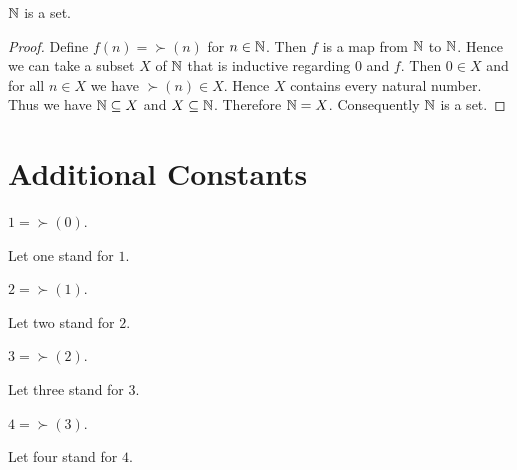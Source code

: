 \documentclass[10pt]{article}
\begin{document}
  \begin{forthel}
    \begin{proposition}
      $\mathbb{N}$ is a set.
    \end{proposition}
    \begin{proof}
      Define $f(n) = \succ(n)$ for $n \in \mathbb{N}$.
      Then $f$ is a map from $\mathbb{N}$ to $\mathbb{N}$.
      Hence we can take a subset $X$ of $\mathbb{N}$ that is inductive regarding
      $0$ and $f$.
      Then $0 \in X$ and for all $n \in X$ we have $\succ(n) \in X$.
      Hence $X$ contains every natural number.
      Thus we have $\mathbb{N} \subseteq X$ and $X \subseteq \mathbb{N}$.
      Therefore $\mathbb{N} = X$.
      Consequently $\mathbb{N}$ is a set.
    \end{proof}
  \end{forthel}


  \section{Additional Constants}

  \begin{forthel}
    \begin{definition}
      $1 = \succ(0)$.
    \end{definition}

    Let one stand for $1$.
  \end{forthel}

  \begin{forthel}
    \begin{definition}
      $2 = \succ(1)$.
    \end{definition}

    Let two stand for $2$.
  \end{forthel}

  \begin{forthel}
    \begin{definition}
      $3 = \succ(2)$.
    \end{definition}

    Let three stand for $3$.
  \end{forthel}

  \begin{forthel}
    \begin{definition}
      $4 = \succ(3)$.
    \end{definition}

    Let four stand for $4$.
  \end{forthel}
\end{document}

